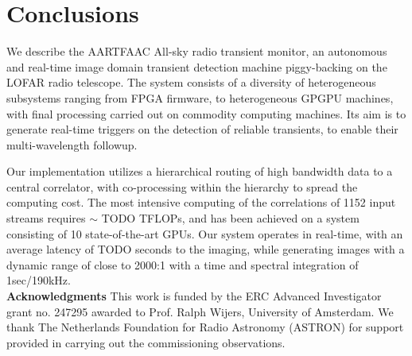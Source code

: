 \documentclass{ws-jai}
\begin{document}
\section {\label{sec:conclusion} Conclusions}
We  describe the  AARTFAAC All-sky  radio transient  monitor, an  autonomous and
real-time image  domain transient detection  machine piggy-backing on  the LOFAR
radio telescope. The  system consists of a diversity  of heterogeneous subsystems
ranging  from  FPGA  firmware,  to   heterogeneous  GPGPU  machines,  with  final
processing carried out on commodity computing  machines.  Its aim is to generate
real-time  triggers on  the detection  of reliable  transients, to  enable their
multi-wavelength followup.

Our implementation utilizes  a hierarchical routing of high bandwidth  data to a
central  correlator,  with co-processing  within  the  hierarchy to  spread  the
computing cost.  The most intensive computing  of the correlations of 1152 input
streams requires $\sim$  TODO TFLOPs, and has been achieved on  a system consisting
of 10 state-of-the-art GPUs.  Our system  operates in real-time, with an average
latency of TODO  seconds to the imaging, while generating  images with a dynamic
range of close to 2000:1 with a time and spectral integration of 1sec/190kHz.\\


\noindent  \textbf{Acknowledgments} This  work  is funded  by  the ERC  Advanced
Investigator  grant no.  247295 awarded  to Prof.   Ralph Wijers,  University of
Amsterdam.  We thank The Netherlands Foundation for Radio Astronomy (ASTRON) for
support provided in carrying out the commissioning observations.



\end{document}
